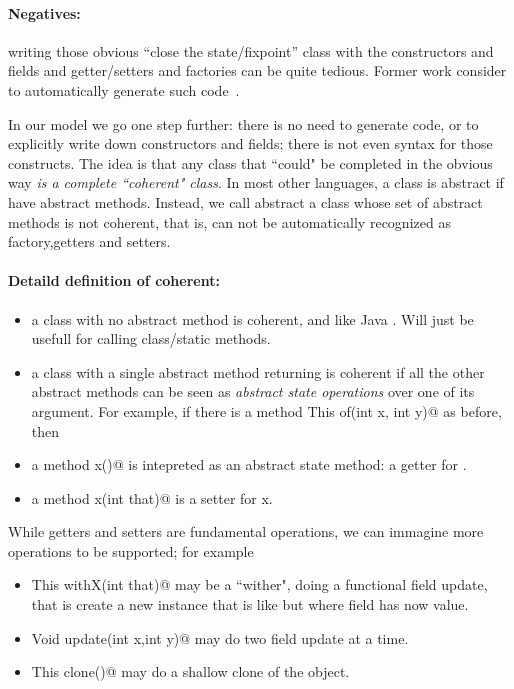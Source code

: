 \paragraph*{Negatives:} writing those obvious ``close the state/fixpoint'' class 
   with the constructors and  fields and getter/setters and factories can be quite tedious.
   Former work consider to automatically generate such code~\cite{wang2016classless}.

In our model we go one step further: there is no need to generate code, or to explicitly
write down constructors and fields; there is not even syntax for those
constructs.
The idea is that any class that ``could" be completed in the obvious way
\emph{is a complete ``coherent" class}.
In most other languages, a class is abstract if have abstract methods.
Instead, we call abstract a class whose set of abstract methods is not
coherent, that is, can not be automatically recognized as factory,getters and setters.
  
\paragraph*{Detaild definition of coherent:}
\begin{itemize}
\item a class with no abstract method is coherent, and like Java \Q@Math@.
Will just be usefull for calling class/static methods.
\item a class with a single abstract \Q@class@ method returning \Q@This@
is coherent if all the other abstract methods can be seen as \emph{abstract state
operations} over one of its argument.
For example,
if there is a \Q@class method This of(int x, int y)@ as before,
then
\item a method \Q@int x()@ is intepreted as an abstract state method: a getter for \Q@x@.
\item a method \Q@Void x(int that)@ is a setter for x.
\end{itemize}

While getters and setters are fundamental operations, we can immagine
more operations to be supported; for example
\begin{itemize}
\item \Q@method This withX(int that)@
may be a ``wither", doing a functional field update, that is create a new instance that is like \Q@this@ but where field \Q@x@ has now \Q@that@ value.
\item \Q@method Void update(int x,int y)@
may do two field update at a time.
\item\Q@method This clone()@ may do a shallow clone of the object.
\end{itemize}

